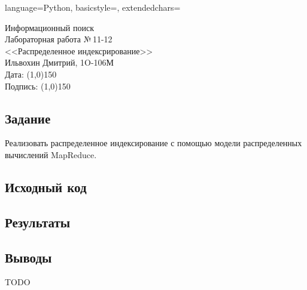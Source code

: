 \documentclass[12pt]{article}
\newcommand{\StudentName}{Ильвохин Дмитрий}
\newcommand{\Group}{1O-106М}
\newcommand{\CourseName}{Информационный поиск}
\newcommand{\LabNum}{11-12}
\newcommand{\Subject}{Распределенное индексрирование}
\begin{document}
\lstset
{
        language=Python,
        basicstyle=\footnotesize,%
        extendedchars=\true
}

\begin{flushright}
\Large{
	\CourseName \\
	Лабораторная работа №\,\LabNum \\
	<<\Subject>> \\
  \StudentName, \Group \\
  Дата: \line(1,0){150} \\
  Подпись: \line(1,0){150} \\
}
\end{flushright}

\subsection*{Задание}
Реализовать распределенное индексирование с помощью модели
распределенных вычислений MapReduce.

\subsection*{Исходный код}


\subsection*{Результаты}


\subsection*{Выводы}
TODO
\end{document}
